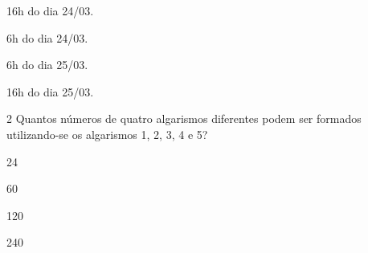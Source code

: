 \begin{multicols}{2}
\begin{escolha}[itemsep=0pt]
    \item 16h do dia 24/03. 
    \item 6h do dia 24/03.
    \item 6h do dia 25/03.
    \item 16h do dia 25/03.
\end{escolha}
\end{multicols}


\num{2} Quantos números de quatro algarismos diferentes podem ser formados
utilizando-se os algarismos 1, 2, 3, 4 e 5?
\begin{multicols}{2}
\begin{escolha}[itemsep=0pt]
    \item 24
    \item 60
    \item 120 
    \item 240
\end{escolha}
\end{multicols}



